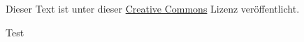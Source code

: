 




\maketitle

Dieser Text ist unter dieser \href{http://creativecommons.org/licenses/by/4.0/}{Creative Commons} Lizenz veröffentlicht.


\tableofcontents

\newpage

Test




